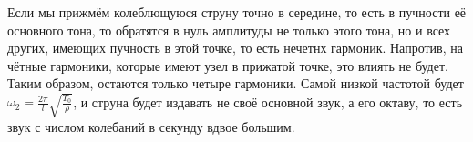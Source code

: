 Если мы прижмём колеблющуюся струну точно в середине, то есть в пучности её основного тона, то обратятся в нуль амплитуды не только этого тона, но и всех других, имеющих пучность в этой точке, то есть нечетнх гармоник. Напротив, на чётные гармоники, которые имеют узел в прижатой точке, это влиять не будет. Таким образом, остаются только четыре гармоники. Самой низкой частотой будет $\omega_2 = \frac{2 \pi}{l} \sqrt{\frac{T_0}{\rho}}$, и струна будет издавать не своё основной звук, а его октаву, то есть звук с числом колебаний в секунду вдвое большим.
